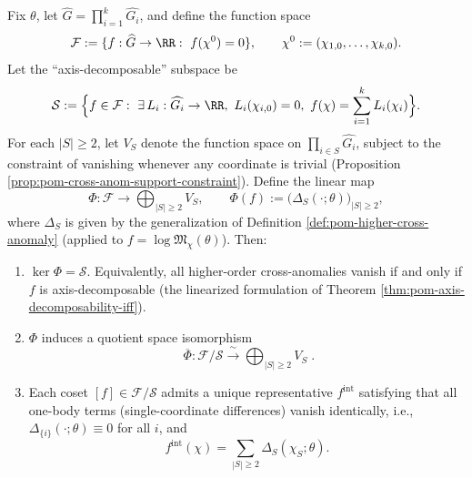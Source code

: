 \begin{theorem}\label{thm:pom-euler-defect-quotient-coordinate}
Fix \(\theta\), let \(\widehat G=\prod_{i=1}^k\widehat{G_i}\), and define the function space
\[
\mathcal{F}:=\{f:\widehat G\to\RR:\ f(\chi^0)=0\},
\qquad
\chi^0:=(\chi_{1,0},\dots,\chi_{k,0}).
\]
Let the ``axis-decomposable'' subspace be
\[
\mathcal{S}:=
\Bigl\{f\in\mathcal{F}:\ \exists\,L_i:\widehat{G_i}\to\RR,\ L_i(\chi_{i,0})=0,\ f(\chi)=\sum_{i=1}^k L_i(\chi_i)\Bigr\}.
\]
For each \(|S|\ge 2\), let \(V_S\) denote the function space on \(\prod_{i\in S}\widehat{G_i}\), subject to the constraint of vanishing whenever any coordinate is trivial (Proposition \ref{prop:pom-cross-anom-support-constraint}).
Define the linear map
\[
\Phi:\mathcal{F}\longrightarrow \bigoplus_{|S|\ge 2}V_S,\qquad
\Phi(f):=\bigl(\Delta_S(\cdot;\theta)\bigr)_{|S|\ge 2},
\]
where \(\Delta_S\) is given by the generalization of Definition \ref{def:pom-higher-cross-anomaly} (applied to \(f=\log\mathfrak{M}_\chi(\theta)\)).
Then:
\begin{enumerate}
  \item \(\ker\Phi=\mathcal{S}\). Equivalently, all higher-order cross-anomalies vanish if and only if \(f\) is axis-decomposable (the linearized formulation of Theorem \ref{thm:pom-axis-decomposability-iff}).
  \item \(\Phi\) induces a quotient space isomorphism
  \[
  \boxed{\;
  \overline\Phi:\mathcal{F}/\mathcal{S}\xrightarrow{\ \sim\ }\bigoplus_{|S|\ge 2}V_S\; }.
  \]
  \item Each coset \([f]\in\mathcal{F}/\mathcal{S}\) admits a unique representative \(f^{\mathrm{int}}\) satisfying that all one-body terms (single-coordinate differences) vanish identically, i.e.,
  \(
  \Delta_{\{i\}}(\cdot;\theta)\equiv 0
  \)
  for all \(i\), and
  \[
  f^{\mathrm{int}}(\chi)=\sum_{|S|\ge 2}\Delta_S(\chi_S;\theta).
  \]
\end{enumerate}
\end{theorem}
